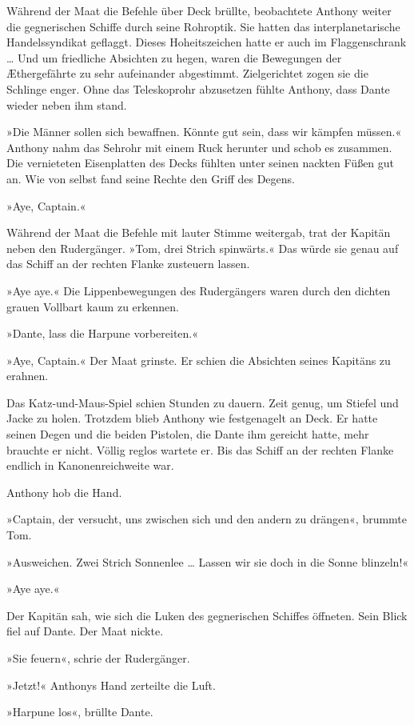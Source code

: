 Während der Maat die Befehle über Deck brüllte, beobachtete Anthony
weiter die gegnerischen Schiffe durch seine Rohroptik. Sie hatten
das interplanetarische Handelssyndikat geflaggt. Dieses
Hoheitszeichen hatte er auch im Flaggenschrank … Und um friedliche
Absichten zu hegen, waren die Bewegungen der Æthergefährte zu sehr
aufeinander abgestimmt. Zielgerichtet zogen sie die Schlinge enger.
Ohne das Teleskoprohr abzusetzen fühlte Anthony, dass Dante wieder
neben ihm stand.

»Die Männer sollen sich bewaffnen. Könnte gut sein, dass wir
kämpfen müssen.« Anthony nahm das Sehrohr mit einem Ruck herunter
und schob es zusammen. Die vernieteten Eisenplatten des Decks
fühlten unter seinen nackten Füßen gut an. Wie von selbst fand
seine Rechte den Griff des Degens.

»Aye, Captain.«

Während der Maat die Befehle mit lauter Stimme weitergab, trat der
Kapitän neben den Rudergänger. »Tom, drei Strich spinwärts.« Das
würde sie genau auf das Schiff an der rechten Flanke zusteuern
lassen.

»Aye aye.« Die Lippenbewegungen des Rudergängers waren durch den
dichten grauen Vollbart kaum zu erkennen.

»Dante, lass die Harpune vorbereiten.«

»Aye, Captain.« Der Maat grinste. Er schien die Absichten seines
Kapitäns zu erahnen.

Das Katz-und-Maus-Spiel schien Stunden zu dauern. Zeit genug, um
Stiefel und Jacke zu holen. Trotzdem blieb Anthony wie festgenagelt
an Deck. Er hatte seinen Degen und die beiden Pistolen, die Dante
ihm gereicht hatte, mehr brauchte er nicht. Völlig reglos wartete
er. Bis das Schiff an der rechten Flanke endlich in
Kanonenreichweite war.

Anthony hob die Hand.

»Captain, der versucht, uns zwischen sich und den andern zu
drängen«, brummte Tom.

»Ausweichen. Zwei Strich Sonnenlee … Lassen wir sie doch in die
Sonne blinzeln!«

»Aye aye.«

Der Kapitän sah, wie sich die Luken des gegnerischen Schiffes
öffneten. Sein Blick fiel auf Dante. Der Maat nickte.

»Sie feuern«, schrie der Rudergänger.

»Jetzt!« Anthonys Hand zerteilte die Luft.

»Harpune los«, brüllte Dante.

